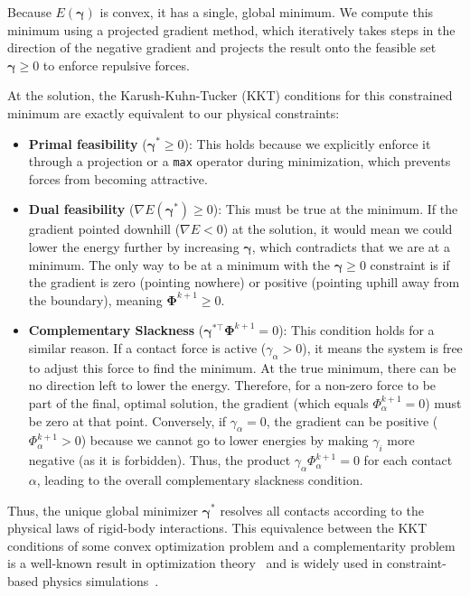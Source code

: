 \documentclass[conference]{IEEEtran}
\begin{document}
Because $E(\boldsymbol{\gamma}) $ is convex, it has a single, global minimum. We compute this minimum using a projected gradient method, which iteratively takes steps in the direction of the negative gradient and projects the result onto the feasible set $\boldsymbol{\gamma} \ge 0$ to enforce repulsive forces.

At the solution, the Karush-Kuhn-Tucker (KKT) conditions for this constrained minimum are exactly equivalent to our physical constraints:

\begin{itemize}
    \item \textbf{Primal feasibility} ($ \boldsymbol{\gamma}^* \ge 0 $): This holds because we explicitly enforce it through a projection or a \texttt{max} operator during minimization, which prevents forces from becoming attractive.

    \item \textbf{Dual feasibility} ($ \nabla E(\boldsymbol{\gamma}^*) \ge 0 $): This must be true at the minimum. If the gradient pointed downhill ($ \nabla E < 0 $) at the solution, it would mean we could lower the energy further by increasing $ \boldsymbol{\gamma} $, which contradicts that we are at a minimum. The only way to be at a minimum with the $ \boldsymbol{\gamma} \ge 0 $ constraint is if the gradient is zero (pointing nowhere) or positive (pointing uphill away from the boundary), meaning $ \boldsymbol{\Phi}^{k+1} \ge 0 $.

    \item \textbf{Complementary Slackness}  ($ \boldsymbol{\gamma}^{*\top} \boldsymbol{\Phi}^{k+1} = 0 $): This condition holds for a similar reason. If a contact force is active ($ \gamma_\alpha > 0$), it means the system is free to adjust this force to find the minimum. At the true minimum, there can be no direction left to lower the energy. Therefore, for a non-zero force to be part of the final, optimal solution, the gradient (which equals $\Phi^{k+1}_\alpha = 0$) must be zero at that point. Conversely, if $ \gamma_\alpha = 0 $, the gradient can be positive ($ \Phi^{k+1}_\alpha > 0 $) because we cannot go to lower energies by making $ \gamma_i $ more negative (as it is forbidden). Thus, the product $ \gamma_\alpha \Phi^{k+1}_\alpha = 0 $ for each contact $\alpha$, leading to the overall complementary slackness condition.

\end{itemize}

Thus, the unique global minimizer $ \boldsymbol{\gamma}^* $ resolves all contacts according to the physical laws of rigid-body interactions. This equivalence between the KKT conditions
of some convex optimization problem and a complementarity problem is a well-known result in
optimization theory~\cite{Nocedal2006} and is widely used in constraint-based physics simulations~\cite{Tasora2008, Yan2019, Li2021, Weady2024,Rudge2012,Macklin2014,Ferguson2021}.
\end{document}
